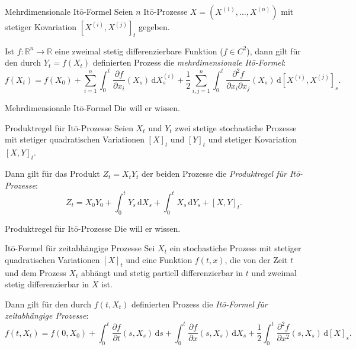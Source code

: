 \begin{defi}{Mehrdimensionale Itō-Formel}
    Seien $n$ Itō-Prozesse $X = (X^{(1)},\dotsc ,X^{(n)})$ mit stetiger Kovariation $[X^{(i)},X^{(j)}]_{t}$ gegeben.

    Ist $f: \mathbb{R}^{n} \to \mathbb{R}$ eine zweimal stetig differenzierbare Funktion ($f \in C^{2}$), dann gilt für den durch $Y_{t}=f(X_{t})$ definierten Prozess die \emph{mehrdimensionale Itō-Formel}:
    \[
        f(X_{t})=f(X_{0})+\sum_{i=1}^{n}\int_{0}^{t}\frac{\partial f}{\partial x_{i}}(X_{s})\,{\mathrm{d}}X_{s}^{(i)}+\frac{1}{2}\sum_{i,j=1}^{n}\int_{0}^{t}\frac{\partial^{2}f}{\partial x_{i}\partial x_{j}}(X_{s})\,{\mathrm{d}}[X^{(i)},X^{(j)}]_{s}.
    \]
\end{defi}

\begin{info}{Mehrdimensionale Itō-Formel}
    Die will er wissen.
\end{info}

\begin{defi}{Produktregel für Itō-Prozesse}
    Seien $X_{t}$ und $Y_{t}$ zwei stetige stochastiche Prozesse mit stetiger quadratischen Variationen $[X]_{t}$ und $[Y]_{t}$ und stetiger Kovariation $[X,Y]_{t}$.

    Dann gilt für das Produkt $Z_{t} = X_{t}Y_{t}$ der beiden Prozesse die \emph{Produktregel für Itō-Prozesse}:
    \[
        Z_{t} = X_{0}Y_{0} + \int_{0}^{t} Y_{s}\,{\mathrm{d}}X_{s} + \int_{0}^{t} X_{s}\,{\mathrm{d}}Y_{s} + [X,Y]_{t}.
    \]
\end{defi}

\begin{info}{Produktregel für Itō-Prozesse}
    Die will er wissen.
\end{info}

\begin{defi}{Itō-Formel für zeitabhängige Prozesse}
    Sei $X_{t}$ ein stochastiche Prozess mit stetiger quadratischen Variationen $[X]_{t}$ und eine Funktion $f(t,x)$, die von der Zeit $t$ und dem Prozess $X_{t}$ abhängt und stetig partiell differenzierbar in $t$ und zweimal stetig differenzierbar in $X$ ist.

    Dann gilt für den durch $f(t,X_{t})$ definierten Prozess die \emph{Itō-Formel für zeitabhängige Prozesse}:
    \[
        f(t,X_{t}) = f(0,X_{0}) + \int_{0}^{t} \frac{\partial f}{\partial t}(s,X_{s})\,{\mathrm{d}}s + \int_{0}^{t} \frac{\partial f}{\partial x}(s,X_{s})\,{\mathrm{d}}X_{s} + \frac{1}{2} \int_{0}^{t} \frac{\partial^{2} f}{\partial x^{2}}(s,X_{s})\,{\mathrm{d}}[X]_{s}.
    \]
\end{defi}

